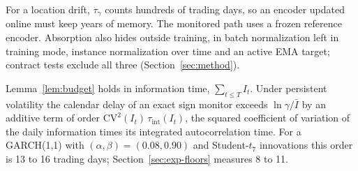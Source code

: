 For a location drift, $\tau_\gamma$ counts hundreds of trading days, so an encoder updated online must keep years of memory. The monitored path uses a frozen reference encoder. Absorption also hides outside training, in batch normalization left in training mode, instance normalization over time and an active EMA target; contract tests exclude all three (Section~\ref{sec:method}).

\begin{remark}\label{rem:volmem}
Lemma~\ref{lem:budget} holds in information time, $\sum_{t\le T}I_t$. Under persistent volatility the calendar delay of an exact sign monitor exceeds $\ln\gamma/\bar I$ by an additive term of order $\mathrm{CV}^2(I_t)\,\tau_{\mathrm{int}}(I_t)$, the squared coefficient of variation of the daily information times its integrated autocorrelation time. For a GARCH(1,1) with $(\alpha,\beta)=(0.08,0.90)$ and Student-$t_7$ innovations this order is 13 to 16 trading days; Section~\ref{sec:exp-floors} measures 8 to 11.
\end{remark}
